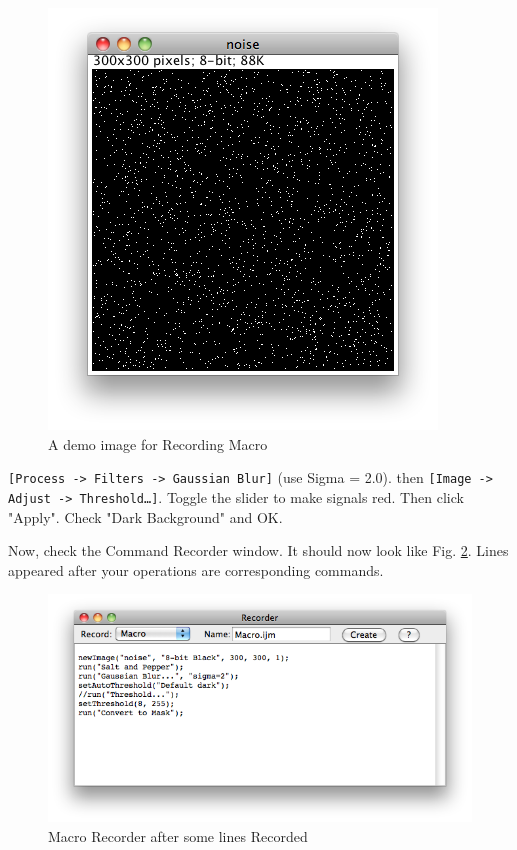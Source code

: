 \documentclass[11pt,a4paper,oneside]{report}
\newcommand{\ijmenu}[1]{\texttt{\small#1}}
\begin{document}
\begin{figure}[htbp]
\begin{center}
\includegraphics[scale=0.6]{fig/SaltandPepper300.png}
\caption{A demo image for Recording Macro} 
\label{fig_SaltAndPepper}
\end{center}
\end{figure}

\ijmenu{[Process -> Filters -> Gaussian Blur]} (use Sigma = 2.0).
then
\ijmenu{[Image -> Adjust -> Threshold\ldots]}. Toggle the slider to make signals red. Then click "Apply". Check "Dark Background" and OK. 

Now, check the Command Recorder window. It should now look like Fig. \ref{fig_macroRecorderFilled}. Lines appeared after your operations are corresponding commands.

\begin{figure}[htbp]
\begin{center}
\includegraphics[scale=0.6]{fig/MacroRecorderFilled.png}
\caption{Macro Recorder after some lines Recorded} 
\label{fig_macroRecorderFilled}
\end{center}
\end{figure}
\end{document}
